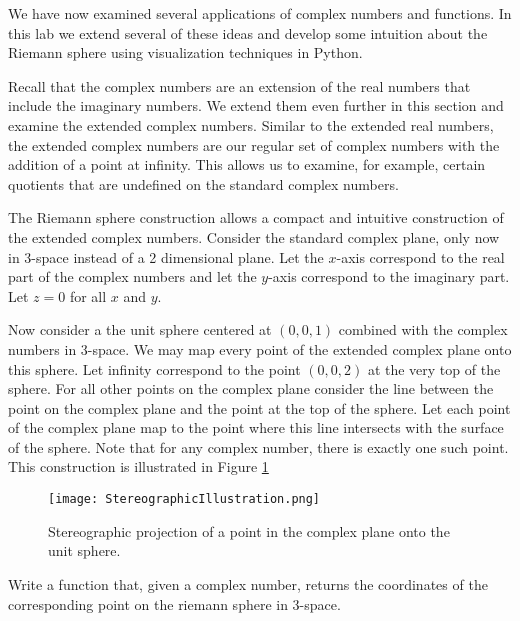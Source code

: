 

We have now examined several applications of complex numbers and functions.
In this lab we extend several of these ideas and develop some intuition about the Riemann sphere using visualization techniques in Python.

Recall that the complex numbers are an extension of the real numbers that include the imaginary numbers.
We extend them even further in this section and examine the extended complex numbers.
Similar to the extended real numbers, the extended complex numbers are our regular set of complex numbers with the addition of a point at infinity.
This allows us to examine, for example, certain quotients that are undefined on the standard complex numbers.

The Riemann sphere construction allows a compact and intuitive construction of the extended complex numbers.
Consider the standard complex plane, only now in 3-space instead of a 2 dimensional plane.
Let the $x$-axis correspond to the real part of the complex numbers and let the $y$-axis correspond to the imaginary part.
Let $z=0$ for all $x$ and $y$. 

Now consider a the unit sphere centered at $(0,0,1)$ combined with the complex numbers in 3-space.
We may map every point of the extended complex plane onto this sphere.
Let infinity correspond to the point $(0,0,2)$ at the very top of the sphere.
For all other points on the complex plane consider the line between the point on the complex plane and the point at the top of the sphere.
Let each point of the complex plane map to the point where this line intersects with the surface of the sphere.
Note that for any complex number, there is exactly one such point.
This construction is illustrated in Figure \ref{riemann:stereographic}

\begin{figure}
\texttt{[image: StereographicIllustration.png]}
\caption{Stereographic projection of a point in the complex plane onto the unit sphere.}
\label{riemann:stereographic}
\end{figure}

\begin{problem}  Write a function that, given a complex number, returns the coordinates of the corresponding point on the riemann sphere in 3-space.
\end{problem}


